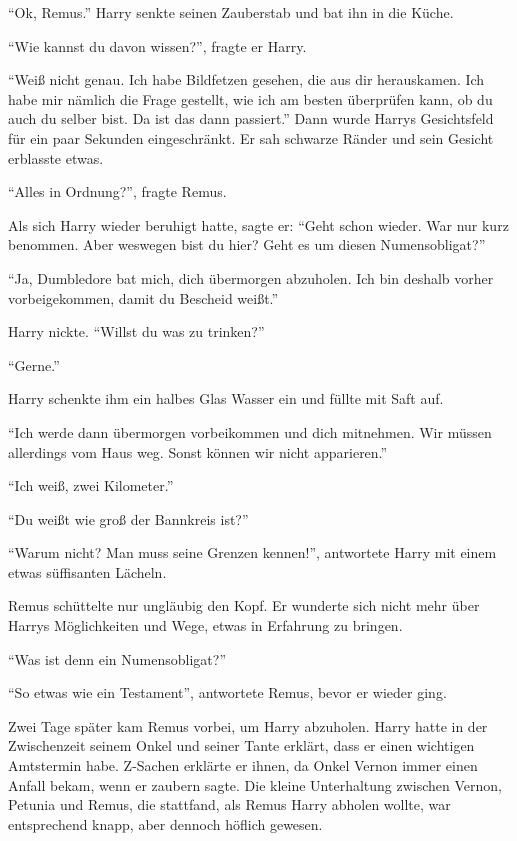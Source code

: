 \enquote{Ok, Remus.} Harry senkte seinen Zauberstab und bat ihn in die Küche.

\enquote{Wie kannst du davon wissen?}, fragte er Harry.

\enquote{Weiß nicht genau. Ich habe Bildfetzen gesehen, die aus dir herauskamen. Ich habe mir nämlich die Frage gestellt, wie ich am besten überprüfen kann, ob du auch du selber bist. Da ist das dann passiert.}  Dann wurde Harrys Gesichtsfeld für ein paar Sekunden eingeschränkt. Er sah schwarze Ränder und sein Gesicht erblasste etwas.

\enquote{Alles in Ordnung?}, fragte Remus.

Als sich Harry wieder beruhigt hatte, sagte er: \enquote{Geht schon wieder. War nur kurz benommen. Aber weswegen bist du hier? Geht es um diesen Numensobligat?}

\enquote{Ja, Dumbledore bat mich, dich übermorgen abzuholen. Ich bin deshalb vorher vorbeigekommen, damit du Bescheid weißt.}

Harry nickte. \enquote{Willst du was zu trinken?}

\enquote{Gerne.}

Harry schenkte ihm ein halbes Glas Wasser ein und füllte mit Saft auf.

\enquote{Ich werde dann übermorgen vorbeikommen und dich mitnehmen. Wir müssen allerdings vom Haus weg. Sonst können wir nicht apparieren.}

\enquote{Ich weiß, zwei Kilometer.}

\enquote{Du weißt wie groß der Bannkreis ist?}

\enquote{Warum nicht? Man muss seine Grenzen kennen!}, antwortete Harry mit einem etwas süffisanten Lächeln.

Remus schüttelte nur ungläubig den Kopf. Er wunderte sich nicht mehr über Harrys Möglichkeiten und Wege, etwas in Erfahrung zu bringen.

\enquote{Was ist denn ein Numensobligat?}

\enquote{So etwas wie ein Testament}, antwortete Remus, bevor er wieder ging.

Zwei Tage später kam Remus vorbei, um Harry abzuholen. Harry hatte in der Zwischenzeit seinem Onkel und seiner Tante erklärt, dass er einen wichtigen Amtstermin habe. Z-Sachen erklärte er ihnen, da Onkel Vernon immer einen Anfall bekam, wenn er zaubern sagte. Die kleine Unterhaltung zwischen Vernon, Petunia und Remus, die stattfand, als Remus Harry abholen wollte, war entsprechend knapp, aber dennoch höflich gewesen.

